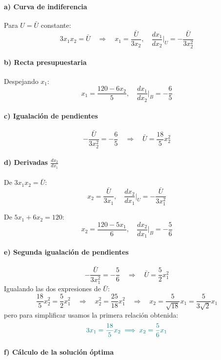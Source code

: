 \documentclass{article}
\begin{document}
\paragraph{a) Curva de indiferencia}

Para \(U = \bar U\) constante:
\[
3x_1x_2 = \bar U
\quad\Longrightarrow\quad
x_1 = \frac{\bar U}{3x_2},
\quad
\frac{dx_1}{dx_2}\Big|_{U} = -\frac{\bar U}{3x_2^2}
\]

\paragraph{b) Recta presupuestaria}

Despejando \(x_1\):
\[
x_1 = \frac{120 - 6x_2}{5},
\quad
\frac{dx_1}{dx_2}\Big|_{B} = -\frac{6}{5}
\]

\paragraph{c) Igualación de pendientes}
\[
-\frac{\bar U}{3x_2^2} = -\frac{6}{5}
\quad\Longrightarrow\quad
\bar U = \frac{18}{5} x_2^2
\]

\paragraph{d) Derivadas \(\frac{dx_2}{dx_1}\)}

De \(3x_1x_2 = \bar U\):
\[
x_2 = \frac{\bar U}{3x_1},
\quad
\frac{dx_2}{dx_1}\Big|_{U} = -\frac{\bar U}{3x_1^2}
\]

De \(5x_1 + 6x_2 = 120\):
\[
x_2 = \frac{120 - 5x_1}{6},
\quad
\frac{dx_2}{dx_1}\Big|_{B} = -\frac{5}{6}
\]

\paragraph{e) Segunda igualación de pendientes}
\[
-\frac{\bar U}{3x_1^2} = -\frac{5}{6}
\quad\Longrightarrow\quad
\bar U = \frac{5}{2} x_1^2
\]
Igualando las dos expresiones de \(\bar U\):
\[
\frac{18}{5} x_2^2 = \frac{5}{2} x_1^2
\quad\Longrightarrow\quad
x_2^2 = \frac{25}{18} x_1^2
\quad\Longrightarrow\quad
x_2 = \frac{5}{\sqrt{18}} x_1
= \frac{5}{3\sqrt{2}} x_1
\]
pero para simplificar usamos la primera relación obtenida:
\[
\color{teal}
3x_1 = \frac{18}{5} x_2
\;\Longrightarrow\;
x_2 = \frac{5}{6} x_1
\]

\paragraph{f) Cálculo de la solución óptima}
\end{document}

